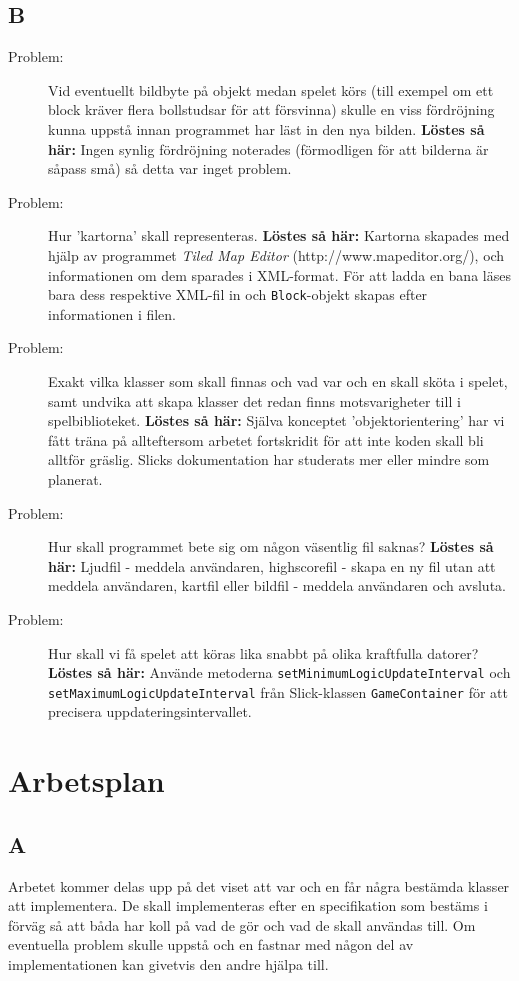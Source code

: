 \documentclass[11pt,a4paper]{article}
\begin{document}
\subsection{B}
\begin{description}
	\item[Problem:] Vid eventuellt bildbyte på objekt medan spelet körs (till exempel om ett block kräver flera bollstudsar för att försvinna) skulle en viss fördröjning kunna uppstå innan programmet har läst in den nya bilden. \textbf{Löstes så här:} Ingen synlig fördröjning noterades (förmodligen för att bilderna är såpass små) så detta var inget problem.
	\item[Problem:] Hur 'kartorna' skall representeras. \textbf{Löstes så här:} Kartorna skapades med hjälp av programmet \emph{Tiled Map Editor} (http://www.mapeditor.org/), och informationen om dem sparades i XML-format. För att ladda en bana läses bara dess respektive XML-fil in och \texttt{Block}-objekt skapas efter informationen i filen.
	\item[Problem:] Exakt vilka klasser som skall finnas och vad var och en skall sköta i spelet, samt undvika att skapa klasser det redan finns motsvarigheter till i spelbiblioteket. \textbf{Löstes så här:} Själva konceptet 'objektorientering' har vi fått träna på allteftersom arbetet fortskridit för att inte koden skall bli alltför gräslig. Slicks dokumentation har studerats mer eller mindre som planerat.
	\item[Problem:] Hur skall programmet bete sig om någon väsentlig fil saknas? \textbf{Löstes så här:} Ljudfil - meddela användaren, highscorefil - skapa en ny fil utan att meddela användaren, kartfil eller bildfil - meddela användaren och avsluta.
	\item[Problem:] Hur skall vi få spelet att köras lika snabbt på olika kraftfulla datorer? \textbf{Löstes så här:} Använde metoderna \texttt{setMinimumLogicUpdateInterval} och \texttt{setMaximumLogicUpdateInterval} från Slick-klassen \texttt{GameContainer} för att precisera uppdateringsintervallet.
\end{description}

\section{Arbetsplan}

\subsection{A}
Arbetet kommer delas upp på det viset att var och en får några bestämda klasser att implementera. De skall implementeras efter en specifikation som bestäms i förväg så att båda har koll på vad de gör och vad de skall användas till. Om eventuella problem skulle uppstå och en fastnar med någon del av implementationen kan givetvis den andre hjälpa till.
\end{document}
